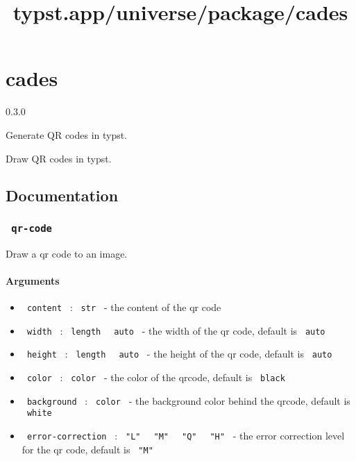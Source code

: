 \title{typst.app/universe/package/cades}

\label{banner}
\section{cades}\label{cades}

{ 0.3.0 }

Generate QR codes in typst.

\label{readme}
Draw QR codes in typst.

\begin{Shaded}
\begin{Highlighting}[]

\end{Highlighting}
\end{Shaded}

\subsection{Documentation}\label{documentation}

\subsubsection{\texorpdfstring{\texttt{\ qr-code\ }}{ qr-code }}\label{qr-code}

Draw a qr code to an image.

\paragraph{Arguments}\label{arguments}

\begin{itemize}
\tightlist
\item
  \texttt{\ content\ } : \texttt{\ str\ } - the content of the qr code
\item
  \texttt{\ width\ } : \texttt{\ length\ } \textbar{} \texttt{\ auto\ }
  - the width of the qr code, default is \texttt{\ auto\ }
\item
  \texttt{\ height\ } : \texttt{\ length\ } \textbar{} \texttt{\ auto\ }
  - the height of the qr code, default is \texttt{\ auto\ }
\item
  \texttt{\ color\ } : \texttt{\ color\ } - the color of the qrcode,
  default is \texttt{\ black\ }
\item
  \texttt{\ background\ } : \texttt{\ color\ } - the background color
  behind the qrcode, default is \texttt{\ white\ }
\item
  \texttt{\ error-correction\ } : \texttt{\ "L"\ } \textbar{}
  \texttt{\ "M"\ } \textbar{} \texttt{\ "Q"\ } \textbar{}
  \texttt{\ "H"\ } - the error correction level for the qr code, default
  is \texttt{\ "M"\ }
\end{itemize}

